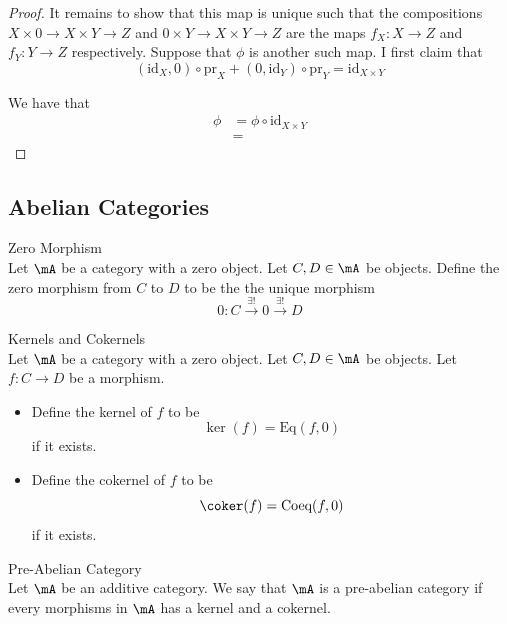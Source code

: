 \documentclass[a4paper]{article}
\begin{document}
\begin{lmm}{}{}
\begin{proof}
It remains to show that this map is unique such that the compositions $X\times 0\to X\times Y\to Z$ and $0\times Y\to X\times Y\to Z$ are the maps $f_X:X\to Z$ and $f_Y:Y\to Z$ respectively. Suppose that $\phi$ is another such map. I first claim that $$(\text{id}_X,0)\circ\text{pr}_X+(0,\text{id}_Y)\circ\text{pr}_Y=\text{id}_{X\times Y}$$


We have that 
\begin{align*}
\phi&=\phi\circ\text{id}_{X\times Y}\\
&=
\end{align*}
\end{proof}
\end{lmm}

\subsection{Abelian Categories}
\begin{defn}{Zero Morphism}{}\\
Let $\mA$ be a category with a zero object. Let $C,D\in\mA$ be objects. Define the zero morphism from $C$ to $D$ to be the the unique morphism $$0:C\overset{\exists!}{\to}0\overset{\exists!}{\to}D$$
\end{defn}

\begin{defn}{Kernels and Cokernels}{}\\
Let $\mA$ be a category with a zero object. Let $C,D\in\mA$ be objects. Let $f:C\to D$ be a morphism. 
\begin{itemize}
\item Define the kernel of $f$ to be $$\ker(f)=\text{Eq}(f,0)$$ if it exists. 
\item Define the cokernel of $f$ to be $$\coker(f)=\text{Coeq}(f,0)$$ if it exists. 
\end{itemize}
\end{defn}

\begin{defn}{Pre-Abelian Category}{}\\
Let $\mA$ be an additive category. We say that $\mA$ is a pre-abelian category if every morphisms in $\mA$ has a kernel and a cokernel. 
\end{defn}
\end{document}

